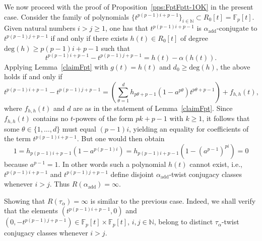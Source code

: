 \documentclass[a4paper,11pt]{amsart}
\numberwithin{equation}{section}
\theoremstyle{plain}
\theoremstyle{definition}
\newcommand{\N}{\mathbb{N}}
\newcommand{\F}{\mathbb{F}}
\newcommand{\addi}[1]{#1_{\text{add}}} %
\newcommand{\set}[1]{\{ #1 \}}
\begin{document}
We now proceed with the proof of Proposition~\ref{pps:FptFptt-1OK} in the present case. Consider the family of polynomials $\set{t^{p(p-1)i+p-1}}_{i \in \N} \subset R_0[t] = \F_p[t]$. Given natural numbers $i > j \geq 1$, one has that $t^{p(p-1)i+p-1}$ is $\addi{\alpha}$-conjugate to $t^{p(p-1)j+p-1}$ if and only if there exists $h(t) \in R_0[t]$ of degree $\mathrm{deg}(h) \geq {p(p-1)i+p-1}$ such that 
\[ t^{p(p-1)i+p-1} - t^{p(p-1)j+p-1} = h(t) - \alpha(h(t)). \]
Applying Lemma~\ref{claimFpt} with $g(t)=h(t)$ and $d_0 \geq \mathrm{deg}(h)$, the above holds if and only if 
\[ t^{p(p-1)i+p-1} - t^{p(p-1)j+p-1} = \left(\sum_{\theta=1}^{d} h_{p\theta+p-1}(1-a^{p\theta})t^{p\theta+p-1}\right) + f_{h,h}(t), \]
where $f_{h,h}(t)$ and $d$ are as in the statement of Lemma~\ref{claimFpt}. Since $f_{h,h}(t)$ contains no $t$-powers of the form $pk+p-1$ with $k\geq 1$, it follows that some $\theta \in \set{1, \ldots, d}$ must equal $(p-1)i$, yielding an equality for coefficients of the term $t^{p(p-1)i+p-1}$. But one would then obtain
\[ 1 = h_{p(p-1)i+p-1}(1-a^{p(p-1)i}) = h_{p(p-1)i+p-1}(1-(a^{p-1})^{pi}) = 0 \]
because $a^{p-1}=1$. In other words such a polynomial $h(t)$ cannot exist, i.e., $t^{p(p-1)i+p-1}$ and  $t^{p(p-1)j+p-1}$ define disjoint $\addi{\alpha}$-twist conjugacy classes whenever $i > j$. Thus $R(\addi{\alpha}) = \infty$.

Showing that $R(\tau_\alpha) = \infty$ is similar to the previous case. Indeed, we shall verify that the elements $(t^{p(p-1)i+p-1},0)$ and $(0,-t^{p(p-1)j+p-1}) \in \F_p[t] \times \F_p[t]$, $i,j\in \N$, belong to distinct $\tau_\alpha$-twist conjugacy classes whenever $i > j$. 
\end{document}
